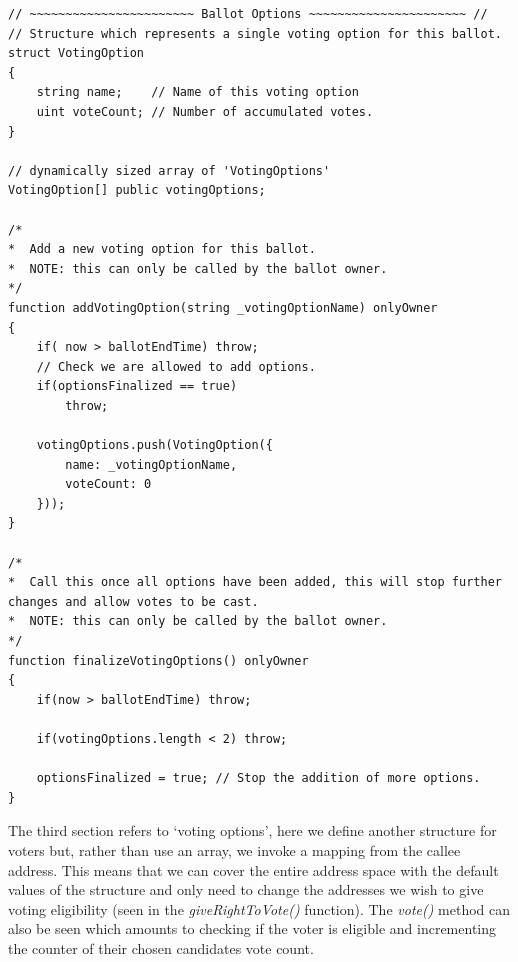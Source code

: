 \documentclass{article}
\begin{document}
\begin{lstlisting}[caption=Functions used for modifying the ballot during setup.]
// ~~~~~~~~~~~~~~~~~~~~~~~ Ballot Options ~~~~~~~~~~~~~~~~~~~~~~ //
// Structure which represents a single voting option for this ballot.
struct VotingOption
{
    string name;    // Name of this voting option
    uint voteCount; // Number of accumulated votes.
}

// dynamically sized array of 'VotingOptions'
VotingOption[] public votingOptions;

/*
*  Add a new voting option for this ballot.
*  NOTE: this can only be called by the ballot owner.
*/
function addVotingOption(string _votingOptionName) onlyOwner
{
    if( now > ballotEndTime) throw;
    // Check we are allowed to add options.
    if(optionsFinalized == true)    
        throw;

    votingOptions.push(VotingOption({
        name: _votingOptionName,
        voteCount: 0
    }));
}

/*
*  Call this once all options have been added, this will stop further changes and allow votes to be cast.
*  NOTE: this can only be called by the ballot owner.
*/
function finalizeVotingOptions() onlyOwner
{
    if(now > ballotEndTime) throw;

    if(votingOptions.length < 2) throw;

    optionsFinalized = true; // Stop the addition of more options.
}
\end{lstlisting}
\clearpage

The third section refers to `voting options', here we define another structure for voters but, rather than use an array, we invoke a mapping from the callee address. This means that we can cover the entire address space with the default values of the structure and only need to change the addresses we wish to give voting eligibility (seen in the \textit{giveRightToVote()} function). The \textit{vote()} method can also be seen which amounts to checking if the voter is eligible and incrementing the counter of their chosen candidates vote count.
\end{document}
